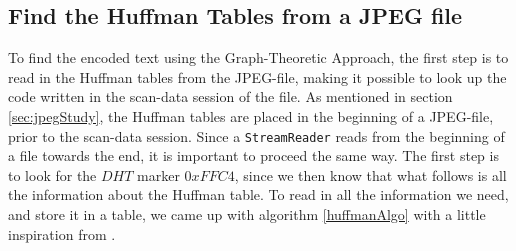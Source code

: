 \subsection{Find the Huffman Tables from a JPEG file}
\label{sec:DesignHuffman}
To find the encoded text using the Graph-Theoretic Approach, the first step is to read in the Huffman tables from the JPEG-file, making it possible to look up the code written in the scan-data session of the file.
As mentioned in section \ref{sec:jpegStudy}, the Huffman tables are placed in the beginning of a JPEG-file, prior to the scan-data session.
Since a \lstinline|StreamReader| reads from the beginning of a file towards the end, it is important to proceed the same way.
The first step is to look for the $DHT$ marker $0xFFC4$, since we then know that what follows is all the information about the Huffman table.
To read in all the information we need, and store it in a table, we came up with algorithm \ref{huffmanAlgo} with a little inspiration from \cite{HuffmanDecoding}.

